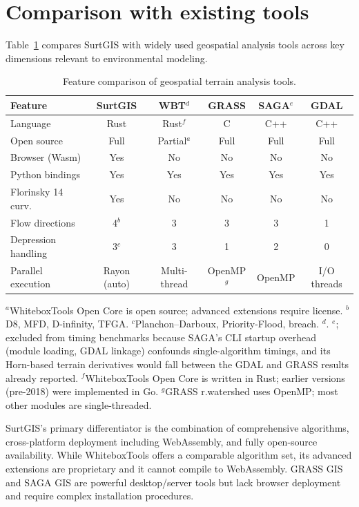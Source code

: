 \documentclass[preprint,review,12pt,authoryear]{elsarticle}
\begin{document}
\section{Comparison with existing tools}
\label{sec:comparison}

Table~\ref{tab:comparison} compares SurtGIS with widely used geospatial analysis tools across key dimensions relevant to environmental modeling.

\begin{table}[htbp]
\centering
\caption{Feature comparison of geospatial terrain analysis tools.}
\label{tab:comparison}
\begin{tabular}{@{}lccccc@{}}
\toprule
Feature & SurtGIS & WBT$^{d}$ & GRASS & SAGA$^{e}$ & GDAL \\
\midrule
Language & Rust & Rust$^{f}$ & C & C++ & C++ \\
Open source & Full & Partial$^{a}$ & Full & Full & Full \\
Browser (Wasm) & Yes & No & No & No & No \\
Python bindings & Yes & Yes & Yes & Yes & Yes \\
Florinsky 14 curv. & Yes & No & No & No & No \\
Flow directions & 4$^{b}$ & 3 & 3 & 3 & 1 \\
Depression handling & 3$^{c}$ & 3 & 1 & 2 & 0 \\
Parallel execution & Rayon (auto) & Multi-thread & OpenMP$^{g}$ & OpenMP & I/O threads \\
\bottomrule
\end{tabular}
\smallskip

{\footnotesize $^{a}$WhiteboxTools Open Core is open source; advanced extensions require license. $^{b}$D8, MFD, D-infinity, TFGA. $^{c}$Planchon--Darboux, Priority-Flood, breach. $^{d}$\citet{lindsay2016wbt}. $^{e}$\citet{conrad2015}; excluded from timing benchmarks because SAGA's CLI startup overhead (module loading, GDAL linkage) confounds single-algorithm timings, and its Horn-based terrain derivatives would fall between the GDAL and GRASS results already reported. $^{f}$WhiteboxTools Open Core is written in Rust; earlier versions (pre-2018) were implemented in Go. $^{g}$GRASS r.watershed uses OpenMP; most other modules are single-threaded.}
\end{table}

SurtGIS's primary differentiator is the combination of comprehensive algorithms, cross-platform deployment including WebAssembly, and fully open-source availability. While WhiteboxTools offers a comparable algorithm set, its advanced extensions are proprietary and it cannot compile to WebAssembly. GRASS GIS and SAGA GIS are powerful desktop/server tools but lack browser deployment and require complex installation procedures.
\end{document}
